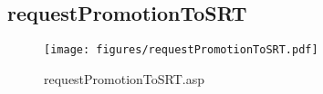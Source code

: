 \subsection{requestPromotionToSRT}
\begin{figure}[htb]
    \begin{center}
        \texttt{[image: figures/requestPromotionToSRT.pdf]}
    \end{center}
    \caption{requestPromotionToSRT.asp}
    \label{fig:requestPromotionToSRT}
\end{figure}
